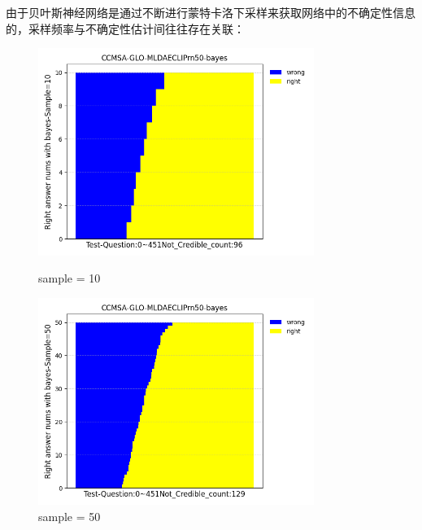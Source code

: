 由于贝叶斯神经网络是通过不断进行蒙特卡洛下采样来获取网络中的不确定性信息的，采样频率与不确定性估计间往往存在关联：
\begin{figure}[htbp]
	\begin{minipage}{0.5\linewidth}
		\centering	
		\includegraphics[width=0.8\textwidth]{Fig/myfig/chapter4/sample10.png}  %
		\caption{\label{modal_bayes_sample10}sample = 10} 	
	\end{minipage}
	\begin{minipage}{0.5\linewidth}
		\centering	
		\includegraphics[width=0.8\textwidth]{Fig/myfig/chapter4/sample50.png}  %
		\caption{\label{modal_bayes_sample50}sample = 50} 	
	\end{minipage}	
\end{figure}
